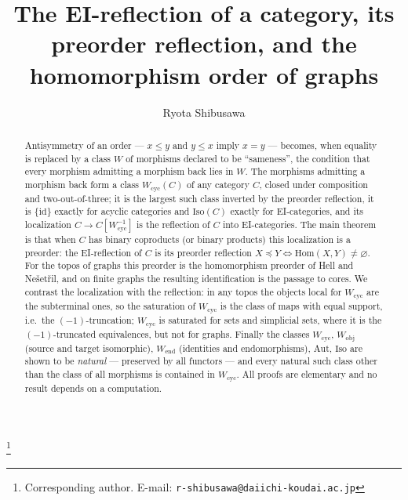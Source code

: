 \documentclass[11pt]{amsart}
\theoremstyle{definition}
\newcommand{\Iso}{\mathrm{Iso}}
\newcommand{\Aut}{\mathrm{Aut}}
\newcommand{\Hom}{\mathrm{Hom}}
\newcommand{\Wcyc}{W_{\mathrm{cyc}}}
\newcommand{\Wobj}{W_{\mathrm{obj}}}
\newcommand{\Wend}{W_{\mathrm{end}}}
\begin{document}
\title[The EI-reflection of a category]{The EI-reflection of a category,
  its preorder reflection, and the homomorphism order of graphs}
\author{Ryota Shibusawa}
\thanks{Corresponding author. E-mail: \texttt{r-shibusawa@daiichi-koudai.ac.jp}}
\address{Daiichi Institute of Technology}

\begin{abstract}
Antisymmetry of an order --- $x\le y$ and $y\le x$ imply $x=y$ --- becomes,
when equality is replaced by a class $W$ of morphisms declared to be
``sameness'', the condition that every morphism admitting a morphism back
lies in $W$. The morphisms admitting a morphism back form a class $\Wcyc(C)$
of any category $C$, closed under composition and two-out-of-three; it is
the largest such class inverted by the preorder reflection, it is $\{\mathrm{id}\}$
exactly for acyclic categories and $\Iso(C)$ exactly for EI-categories, and
its localization $C\to C[\Wcyc^{-1}]$ is the reflection of $C$ into
EI-categories. The main theorem is that when $C$ has binary coproducts (or
binary products) this localization is a preorder: the EI-reflection of $C$
is its preorder reflection $X\preceq Y\iff\Hom(X,Y)\neq\varnothing$. For the
topos of graphs this preorder is the homomorphism preorder of Hell and
Ne\v set\v ril, and on finite graphs the resulting identification is the
passage to cores. We contrast the localization with the reflection: in any
topos the objects local for $\Wcyc$ are the subterminal ones, so the
saturation of $\Wcyc$ is the class of maps with equal support, i.e.\ the
$(-1)$-truncation; $\Wcyc$ is saturated for sets and simplicial sets, where
it is the $(-1)$-truncated equivalences, but not for graphs. Finally the
classes $\Wcyc$, $\Wobj$ (source and target isomorphic), $\Wend$ (identities
and endomorphisms), $\Aut$, $\Iso$ are shown to be \emph{natural} --- preserved
by all functors --- and every natural such class other than the class of all
morphisms is contained in $\Wcyc$. All proofs are elementary and no result
depends on a computation.
\end{abstract}

\maketitle
\end{document}
